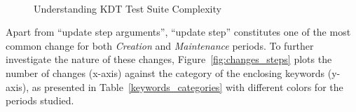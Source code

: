\begin{figure}
\centering
{}
\\
\caption{Understanding KDT Test Suite Complexity}  
\label{fig:code_metrics}
\end{figure}


Apart from ``update step arguments'', ``update step'' constitutes one of the most common change for both \emph{Creation} and \emph{Maintenance} periods. To further investigate the nature of these changes, Figure~\ref{fig:changes_steps} plots the number of changes (x-axis) against the category of the enclosing keywords (y-axis), as presented in Table~\ref{keywords_categories} with different colors for the periods studied.

